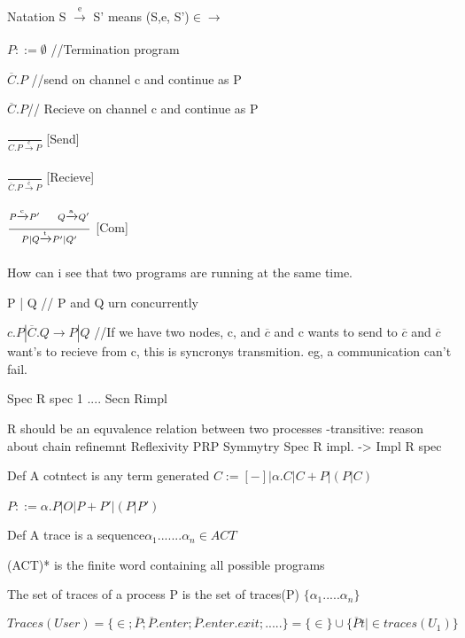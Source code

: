 \documentclass[a4paper,10pt,titlepage]{report}
\begin{document}
Natation S $ \xrightarrow[\text{}]{\text{e}} $ S' means (S,e, S')$ \in \rightarrow$ 


$P::= \emptyset$ \hspace{20mm}//Termination program

$\overline{C}.P$ \hspace{24mm}//send on channel c and continue as P 

$\overline{C}.P $\hspace{25mm}// Recieve on channel c and continue as P 


$ \frac{}{C.P \xrightarrow[\text{}]{\text{c}}P}  $ [Send]

$ \frac{}{ \overline{C}.P \xrightarrow[\text{}]{\overline{ \text{c} }}P}  $ [Recieve]

$ \frac{P \xrightarrow[\text{}]{{ \text{c} }}P' \hspace{5mm} Q\xrightarrow[\text{}]{{ \text{a} }}Q'}{P|Q \xrightarrow[\text{}]{{ \text{t} }}P'| Q'}  $ [Com]




How can i see that two programs are running at the same time.

P | Q \hspace{21mm}// P and Q urn concurrently

$c.P | \overline{C}.Q \rightarrow P | Q$ \hspace{2mm} //If we have two nodes, c, and $\overline{c}$ and c wants to send to $\overline{c}$ and $\overline{c}$ want's to recieve from c, this is syncronys transmition. eg, a communication can't fail.




Spec R spec 1 .... Secn Rimpl

R should be an equvalence relation between two processes
	-transitive: reason about chain refinemnt
	Reflexivity PRP
	Symmytry Spec R impl. -> Impl R spec
	
	
Def
A cotntect is any term generated
$
C:= [-] | \alpha .C | C+P | (P|C)
$

$
P::= \alpha . P | O | P+P' | (P|P')
$



Def
A trace is a sequence$  \alpha_1 ....... \alpha_n \in ACT $

(ACT)* is the finite word containing all possible programs




The set of traces of a process P is the set of traces(P) $\{\alpha_1 ..... \alpha_n\}$


\begin{equation}
Traces(User) = \{\in;  \overline{P}; \overline{P}.enter; \overline{P}.enter.exit; .....\} = \{\in\} \cup \{\overline{P}t | \in traces (U_1)\}  
\end{equation}
		     
\end{document}
